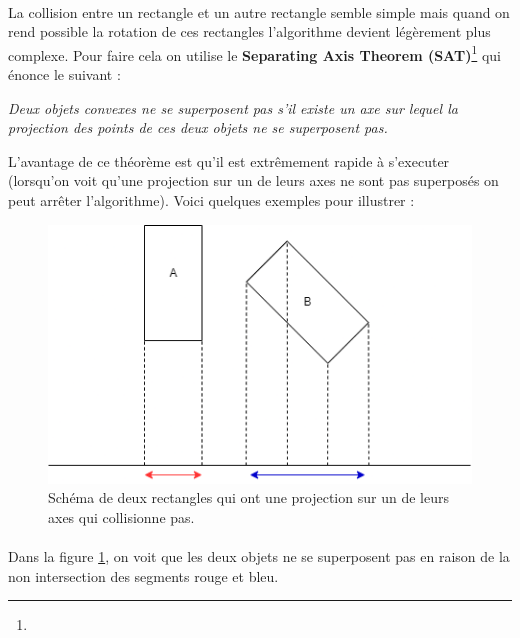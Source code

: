\documentclass{EPUProjetDi}
\begin{document}
\paragraph{}
La collision entre un rectangle et un autre rectangle semble simple mais quand on rend possible la rotation de ces rectangles l'algorithme devient légèrement plus complexe.
Pour faire cela on utilise le \textbf{Separating Axis Theorem (SAT)}\footnote{} qui énonce le suivant :

\textit{Deux objets convexes ne se superposent pas s'il existe un axe sur lequel la projection des points de ces deux objets ne se superposent pas.}

L'avantage de ce théorème est qu'il est extrêmement rapide à s'executer (lorsqu'on voit qu'une projection sur un de leurs axes ne sont pas superposés on peut arrêter l'algorithme).
Voici quelques exemples pour illustrer : 

\begin{figure}[h]
    \centering
    \includegraphics[scale=0.6]{rectangle_collider_rectangle_1.png}
    \caption{Schéma de deux rectangles qui ont une projection sur un de leurs axes qui collisionne pas.}
    \label{fig:rectangle_collider_rectangle_1}
\end{figure}

\paragraph{}
Dans la figure \ref{fig:rectangle_collider_rectangle_1}, on voit que les deux objets ne se superposent pas en raison de la non intersection des segments rouge et bleu.
\end{document}
